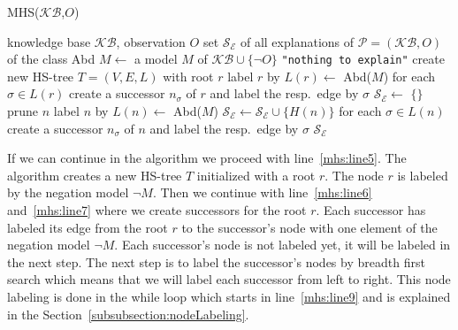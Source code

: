 \documentclass[12pt,a4paper]{article}
\begin{document}
\begin{algorithm}[H] 
	\footnotesize
	\caption{MHS($\mathcal{KB}$,$O$)}
	\label{alg:mhs}
	\begin{algorithmic}[1]
		\Require knowledge base $\mathcal{KB}$, observation $O$
		\Ensure set $\mathcal{S}_{\mathcal{E}}$ of all explanations of $\mathcal{P}=(\mathcal{KB},O)$ of the class Abd
		\State $M \gets$ a model $M$ of $\mathcal{KB} \cup \{\neg O\}$ \label{mhs:line1}
		 \label{mhs:line2}
		\State \Return \texttt{"nothing to explain"} %
		\label{soal:nte}
		\EndIf %
		\State create new HS-tree $T=(V,E,L)$ with root $r$ \label{mhs:line5}
		\State label $r$ by $L(r) \gets$ Abd($M$) \label{mhs:line6}
		\State for each $\sigma\in L(r)$ create a successor $n_\sigma$ of $r$ \label{mhs:line7}
		and label the resp.\ edge by $\sigma$ %
		\State $\mathcal{S}_{\mathcal{E}} \gets$ $\{\}$ %
		  \label{mhs:line9}
		 \label{mhs:line10}
		\State prune $n$
		\State label $n$ by $L(n) \gets$  Abd($M$) 
		\Else %
		\State $\mathcal{S}_\mathcal{E} \gets \mathcal{S}_\mathcal{E} \cup \{H(n)\}$ \label{mhs:line15}
		\EndIf
		\State for each $\sigma\in L(n)$ create a successor $n_\sigma$ of $n$
		and label the resp.\ edge by $\sigma$ %
		\label{soal:modproc:e}
		\EndWhile
		\label{soal:loop:e}
		\label{soal:output}
		\State \Return $\mathcal{S}_\mathcal{E}$ \label{mhs:line19}
	\end{algorithmic}
\end{algorithm}

If we can continue in the algorithm we proceed with line~\ref{mhs:line5}. The algorithm creates a new HS-tree $T$ initialized with a root $r$. The node $r$ is labeled by the negation model $\neg M$. Then we continue with line~\ref{mhs:line6} and~\ref{mhs:line7} where we create successors for the root $r$. Each successor has labeled its edge from the root $r$ to the successor's node with one element of the negation model $\neg M$. Each successor's node is not labeled yet, it will be labeled in the next step. The next step is to label the successor's nodes by breadth first search which means that we will label each successor from left to right. This node labeling is done in the while loop which starts in line~\ref{mhs:line9} and is explained in the Section~\ref{subsubsection:nodeLabeling}.
\end{document}
